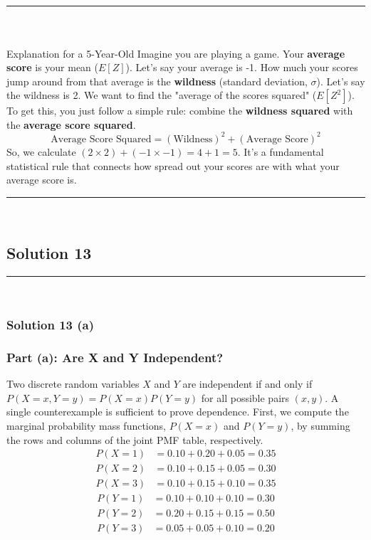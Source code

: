 \documentclass{article}
\begin{document}
\noindent\rule{\textwidth}{0.4pt}\\

\subsubsection*{\normalfont}{Explanation for a 5-Year-Old}
Imagine you are playing a game. Your \textbf{average score} is your mean ($E[Z]$). Let's say your average is -1. How much your scores jump around from that average is the \textbf{wildness} (standard deviation, $\sigma$). Let's say the wildness is 2. We want to find the "average of the scores squared" ($E[Z^2]$). To get this, you just follow a simple rule: combine the \textbf{wildness squared} with the \textbf{average score squared}.
$$ \text{Average Score Squared} = (\text{Wildness})^2 + (\text{Average Score})^2 $$
So, we calculate $(2 \times 2) + (-1 \times -1) = 4 + 1 = 5$. It's a fundamental statistical rule that connects how spread out your scores are with what your average score is.



\noindent\rule{\textwidth}{0.4pt}\\

\newpage

\subsection*{Solution 13}
\noindent\rule{\textwidth}{0.4pt}\\
\subsubsection*{Solution  13 (a)}

\subsubsection*{Part (a): Are X and Y Independent?}

\parbox{\textwidth}{
Two discrete random variables $X$ and $Y$ are independent if and only if $P(X=x, Y=y) = P(X=x)P(Y=y)$ for all possible pairs $(x, y)$. A single counterexample is sufficient to prove dependence. First, we compute the marginal probability mass functions, $P(X=x)$ and $P(Y=y)$, by summing the rows and columns of the joint PMF table, respectively.
\begin{align*}
    P(X=1) &= 0.10 + 0.20 + 0.05 = 0.35 \\
    P(X=2) &= 0.10 + 0.15 + 0.05 = 0.30 \\
    P(X=3) &= 0.10 + 0.15 + 0.10 = 0.35
\end{align*}
\begin{align*}
    P(Y=1) &= 0.10 + 0.10 + 0.10 = 0.30 \\
    P(Y=2) &= 0.20 + 0.15 + 0.15 = 0.50 \\
    P(Y=3) &= 0.05 + 0.05 + 0.10 = 0.20
\end{align*}
}
\vspace{1em}
\end{document}
